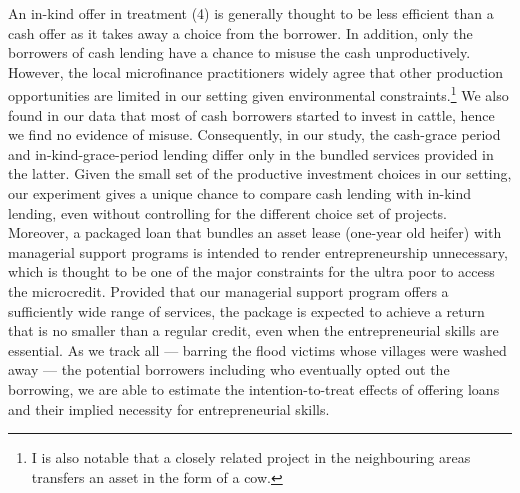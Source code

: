 	An in-kind offer in treatment (4) is generally thought to be less efficient than a cash offer as it takes away a choice from the borrower. In addition, only the borrowers of cash lending have a chance to misuse the cash unproductively. However, the local microfinance practitioners widely agree that other production opportunities are limited in our setting given environmental constraints.\footnote{I is also notable that a closely related project in the neighbouring areas transfers an asset in the form of a cow\citep{BandieraBRAC2017}. }  
	We also found in our data that most of cash borrowers started to invest in cattle, hence we find no evidence of misuse. Consequently, in our study, the cash-grace period and in-kind-grace-period lending differ only in the bundled services provided in the latter. Given the small set of the productive investment choices in our setting, our experiment gives a unique chance to compare cash lending with in-kind lending, even without controlling for the different choice set of projects. Moreover, a packaged loan that bundles an asset lease (one-year old heifer) with managerial support programs is intended to render entrepreneurship unnecessary, which is thought to be one of the major constraints for the ultra poor to access the microcredit. Provided that our managerial support program offers a sufficiently wide range of services, the package is expected to achieve a return that is no smaller than a regular credit, even when the entrepreneurial skills are essential. 
	As we track all --- barring the flood victims whose villages were washed away --- the potential borrowers including who eventually opted out the borrowing, we are able to estimate the intention-to-treat effects of offering loans and their implied necessity for entrepreneurial skills.

